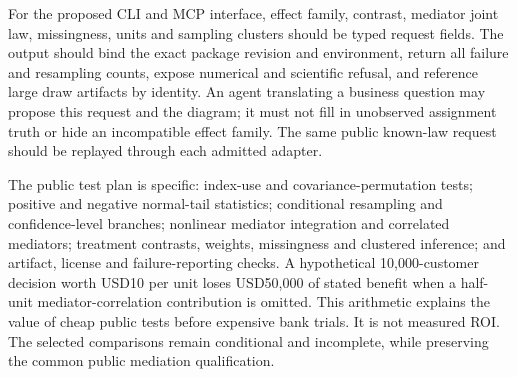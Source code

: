 For the proposed CLI and MCP interface, effect family, contrast, mediator joint
law, missingness, units and sampling clusters should be typed request fields.
The output should bind the exact package revision and environment, return all
failure and resampling counts, expose numerical and scientific refusal, and
reference large draw artifacts by identity. An agent translating a business
question may propose this request and the diagram; it must not fill in
unobserved assignment truth or hide an incompatible effect family. The same
public known-law request should be replayed through each admitted adapter.

The public test plan is specific: index-use and covariance-permutation tests;
positive and negative normal-tail statistics; conditional resampling and
confidence-level branches; nonlinear mediator integration and correlated
mediators; treatment contrasts, weights, missingness and clustered inference;
and artifact, license and failure-reporting checks. A hypothetical 10,000-customer
decision worth USD10 per unit loses USD50,000 of stated benefit when a
half-unit mediator-correlation contribution is omitted. This arithmetic explains
the value of cheap public tests before expensive bank trials. It is not measured
ROI. The selected comparisons remain conditional and incomplete, while
preserving the common public mediation qualification.\citep{exec25_omed_choice}
